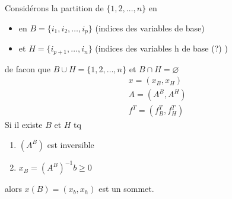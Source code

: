 \documentclass{article}
\theoremstyle{plain}%
\theoremstyle{definition}
\theoremstyle{remark}
\begin{document}
Considérons la partition de $ \{1,2,\dots,n\} $ en \begin{itemize}
    \item en $ B = \{i_1, i_2, \dots, i_p\} $ (indices des variables de base)
    \item et $ H = \{i_{p+1}, \dots, i_n\} $ (indices des variables h de base (?) )
\end{itemize}
de facon que $ B \cup H = \{1,2,\dots, n\} $ et $ B \cap H = \varnothing $ 
\begin{align*}
    & x=(x_B, x_H) \\
    & A = (A^B, A^H) \\
    & f^T = (f^T_B, f^T_H)
\end{align*}
Si il existe $ B $ et $ H $ tq 
\begin{enumerate}
    \item $ (A^B) $ est inversible
    \item $ x_B = (A^B)^{-1} b \geq 0 $ 
\end{enumerate}
alors $ x(B) = (x_b, x_h) $ est un sommet.
\end{document}
